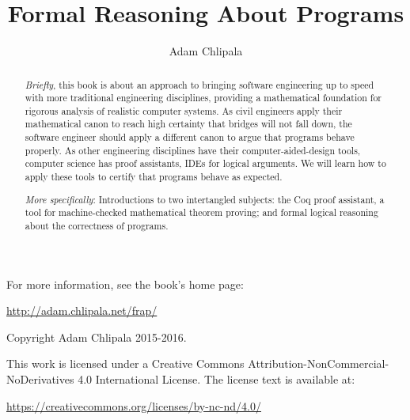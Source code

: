 \documentclass{amsbook}
\theoremstyle{definition}
\theoremstyle{remark}
\numberwithin{section}{chapter}
\numberwithin{equation}{chapter}
\begin{document}
\frontmatter

\title{Formal Reasoning About Programs}


\author{Adam Chlipala}
\address{MIT, Cambridge, MA, USA}

\begin{abstract}
  \emph{Briefly}, this book is about an approach to bringing software engineering up to speed with more traditional engineering disciplines, providing a mathematical foundation for rigorous analysis of realistic computer systems. As civil engineers apply their mathematical canon to reach high certainty that bridges will not fall down, the software engineer should apply a different canon to argue that programs behave properly. As other engineering disciplines have their computer-aided-design tools, computer science has proof assistants, IDEs for logical arguments. We will learn how to apply these tools to certify that programs behave as expected.

  \emph{More specifically}: Introductions to two intertangled subjects: the Coq proof assistant, a tool for machine-checked mathematical theorem proving; and formal logical reasoning about the correctness of programs.
\end{abstract}

\maketitle

\newpage

For more information, see the book's home page:

\begin{center} \url{http://adam.chlipala.net/frap/} \end{center}

\thispagestyle{empty}
\mbox{}\vfill
\begin{center}

Copyright Adam Chlipala 2015-2016.


This work is licensed under a
Creative Commons Attribution-NonCommercial-NoDerivatives 4.0 International License.
The license text is available at:

\end{center}

\begin{center} \url{https://creativecommons.org/licenses/by-nc-nd/4.0/} \end{center}
\end{document}
